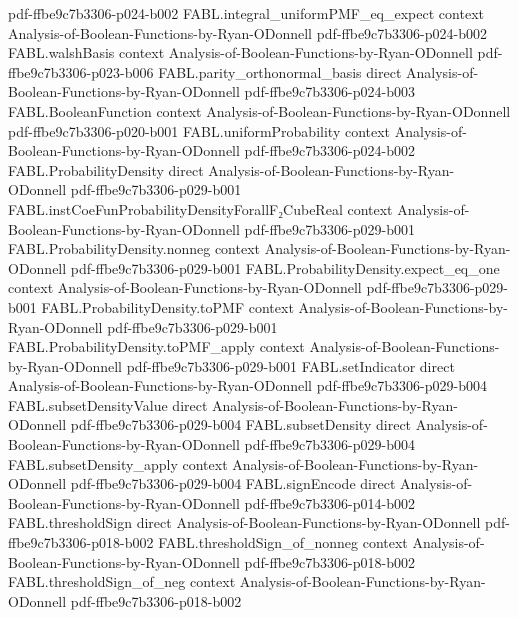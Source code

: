 \begin{theorem}
  {pdf-ffbe9c7b3306-p024-b002}
\proofstep
  {FABL.integral_uniformPMF_eq_expect}
  {context}
  {Analysis-of-Boolean-Functions-by-Ryan-ODonnell}
  {pdf-ffbe9c7b3306-p024-b002}
\proofstep
  {FABL.walshBasis}
  {context}
  {Analysis-of-Boolean-Functions-by-Ryan-ODonnell}
  {pdf-ffbe9c7b3306-p023-b006}
\proofstep
  {FABL.parity_orthonormal_basis}
  {direct}
  {Analysis-of-Boolean-Functions-by-Ryan-ODonnell}
  {pdf-ffbe9c7b3306-p024-b003}
\proofstep
  {FABL.BooleanFunction}
  {context}
  {Analysis-of-Boolean-Functions-by-Ryan-ODonnell}
  {pdf-ffbe9c7b3306-p020-b001}
\proofstep
  {FABL.uniformProbability}
  {context}
  {Analysis-of-Boolean-Functions-by-Ryan-ODonnell}
  {pdf-ffbe9c7b3306-p024-b002}
\proofstep
  {FABL.ProbabilityDensity}
  {direct}
  {Analysis-of-Boolean-Functions-by-Ryan-ODonnell}
  {pdf-ffbe9c7b3306-p029-b001}
\proofstep
  {FABL.instCoeFunProbabilityDensityForallF₂CubeReal}
  {context}
  {Analysis-of-Boolean-Functions-by-Ryan-ODonnell}
  {pdf-ffbe9c7b3306-p029-b001}
\proofstep
  {FABL.ProbabilityDensity.nonneg}
  {context}
  {Analysis-of-Boolean-Functions-by-Ryan-ODonnell}
  {pdf-ffbe9c7b3306-p029-b001}
\proofstep
  {FABL.ProbabilityDensity.expect_eq_one}
  {context}
  {Analysis-of-Boolean-Functions-by-Ryan-ODonnell}
  {pdf-ffbe9c7b3306-p029-b001}
\proofstep
  {FABL.ProbabilityDensity.toPMF}
  {context}
  {Analysis-of-Boolean-Functions-by-Ryan-ODonnell}
  {pdf-ffbe9c7b3306-p029-b001}
\proofstep
  {FABL.ProbabilityDensity.toPMF_apply}
  {context}
  {Analysis-of-Boolean-Functions-by-Ryan-ODonnell}
  {pdf-ffbe9c7b3306-p029-b001}
\proofstep
  {FABL.setIndicator}
  {direct}
  {Analysis-of-Boolean-Functions-by-Ryan-ODonnell}
  {pdf-ffbe9c7b3306-p029-b004}
\proofstep
  {FABL.subsetDensityValue}
  {direct}
  {Analysis-of-Boolean-Functions-by-Ryan-ODonnell}
  {pdf-ffbe9c7b3306-p029-b004}
\proofstep
  {FABL.subsetDensity}
  {direct}
  {Analysis-of-Boolean-Functions-by-Ryan-ODonnell}
  {pdf-ffbe9c7b3306-p029-b004}
\proofstep
  {FABL.subsetDensity_apply}
  {context}
  {Analysis-of-Boolean-Functions-by-Ryan-ODonnell}
  {pdf-ffbe9c7b3306-p029-b004}
\proofstep
  {FABL.signEncode}
  {direct}
  {Analysis-of-Boolean-Functions-by-Ryan-ODonnell}
  {pdf-ffbe9c7b3306-p014-b002}
\proofstep
  {FABL.thresholdSign}
  {direct}
  {Analysis-of-Boolean-Functions-by-Ryan-ODonnell}
  {pdf-ffbe9c7b3306-p018-b002}
\proofstep
  {FABL.thresholdSign_of_nonneg}
  {context}
  {Analysis-of-Boolean-Functions-by-Ryan-ODonnell}
  {pdf-ffbe9c7b3306-p018-b002}
\proofstep
  {FABL.thresholdSign_of_neg}
  {context}
  {Analysis-of-Boolean-Functions-by-Ryan-ODonnell}
  {pdf-ffbe9c7b3306-p018-b002}

\end{theorem}
